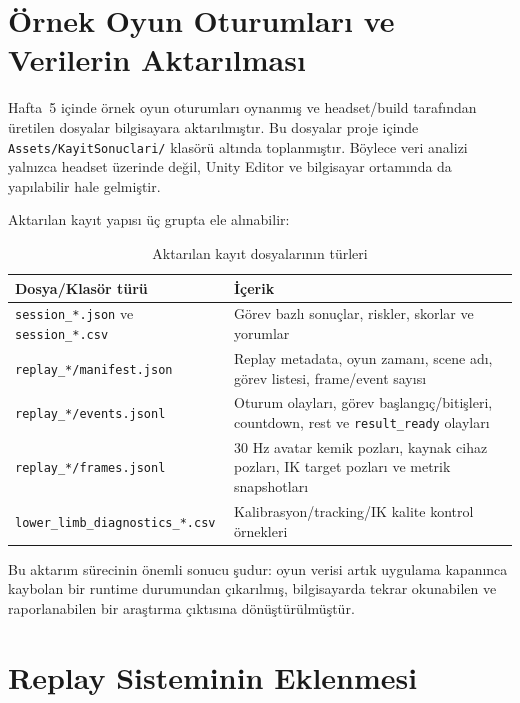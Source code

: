 \documentclass[11pt,a4paper]{article}
\begin{document}
\section{Örnek Oyun Oturumları ve Verilerin Aktarılması}
\label{sec:kayitlar}

Hafta~5 içinde örnek oyun oturumları oynanmış ve headset/build tarafından
üretilen dosyalar bilgisayara aktarılmıştır. Bu dosyalar proje içinde
\texttt{Assets/KayitSonuclari/} klasörü altında toplanmıştır. Böylece veri
analizi yalnızca headset üzerinde değil, Unity Editor ve bilgisayar ortamında
da yapılabilir hale gelmiştir.

Aktarılan kayıt yapısı üç grupta ele alınabilir:

\begin{table}[H]
\centering
\caption{Aktarılan kayıt dosyalarının türleri}
\label{tab:kayit_turleri}
\renewcommand{\arraystretch}{1.22}
\begin{tabularx}{\textwidth}{lX}
\toprule
\textbf{Dosya/Klasör türü} & \textbf{İçerik} \\
\midrule
\texttt{session\_*.json} ve \texttt{session\_*.csv} & Görev bazlı sonuçlar, riskler, skorlar ve yorumlar \\
\texttt{replay\_*/manifest.json} & Replay metadata, oyun zamanı, scene adı, görev listesi, frame/event sayısı \\
\texttt{replay\_*/events.jsonl} & Oturum olayları, görev başlangıç/bitişleri, countdown, rest ve \texttt{result\_ready} olayları \\
\texttt{replay\_*/frames.jsonl} & 30 Hz avatar kemik pozları, kaynak cihaz pozları, IK target pozları ve metrik snapshotları \\
\texttt{lower\_limb\_diagnostics\_*.csv} & Kalibrasyon/tracking/IK kalite kontrol örnekleri \\
\bottomrule
\end{tabularx}
\end{table}

Bu aktarım sürecinin önemli sonucu şudur: oyun verisi artık uygulama kapanınca
kaybolan bir runtime durumundan çıkarılmış, bilgisayarda tekrar okunabilen ve
raporlanabilen bir araştırma çıktısına dönüştürülmüştür.

\section{Replay Sisteminin Eklenmesi}
\label{sec:replay}
\end{document}
